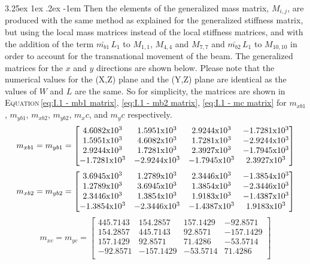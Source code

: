 \documentclass[11pt,a4paper,titlepage]{report}
\makeatletter
\renewcommand\paragraph{\@startsection{paragraph}{5}{\z@}%
  {3.25ex \@plus1ex \@minus.2ex}%
  {-1em}%
  {\normalfont\normalsize\bfseries}}
\makeatother
\begin{document}
\paragraph{}Then the elements of the generalized mass matrix, $M_{i,j}$, are produced with the same method as explained for the generalized stiffness matrix, but using the local mass matrices instead of the local stiffness matrices, and with the addition of the term $\bar{m_{b1}}\,L_1$ to $M_{1,1}$, $M_{4,4}$ and $M_{7,7}$ and $\bar{m_{b2}}\,L_1$ to $M_{10,10}$ in order to account for the transnational movement of the beam. The generalized matrices for the $x$ and $y$ directions are shown below. Please note that the numerical values for the (X,Z) plane and the (Y,Z) plane are identical as the values of $W$ and $L$ are the same. So for simplicity, the matrices are shown in \textsc{Equation}\,\eqref{eq:I.1 - mb1 matrix}, \eqref{eq:I.1 - mb2 matrix}, \eqref{eq:I.1 - mc matrix} for $m_{xb1}$, $m_{yb1}$, $m_{xb2}$, $m_{yb2}$, $m_xc$, and $m_yc$ respectively. 
\begin{equation}
m_{xb1}=m_{yb1}=
\left[
    \begin{matrix}
    4.6082$x$10^3 & 1.5951$x$10^3 & 2.9244$x$10^3 & -1.7281$x$10^3\\
    1.5951$x$10^3 & 4.6082$x$10^3 & 1.7281$x$10^3 & -2.9244$x$10^3\\
    2.9244$x$10^3 & 1.7281$x$10^3 & 2.3927$x$10^3 & -1.7945$x$10^3\\
    -1.7281$x$10^3 & -2.9244$x$10^3 & -1.7945$x$10^3 & 2.3927$x$10^3\\
    \end{matrix}
\right]
\label{eq:I.1 - mb1 matrix}
\end{equation}
\begin{equation}
m_{xb2}=m_{yb2}=
\left[
    \begin{matrix}
    3.6945$x$10^3 & 1.2789$x$10^3 & 2.3446$x$10^3 & -1.3854$x$10^3\\
    1.2789$x$10^3 & 3.6945$x$10^3 & 1.3854$x$10^3 & -2.3446$x$10^3\\
    2.3446$x$10^3 & 1.3854$x$10^3 & 1.9183$x$10^3 & -1.4387$x$10^3\\
   -1.3854$x$10^3 & -2.3446$x$10^3 & -1.4387$x$10^3 & 1.9183$x$10^3\\
    \end{matrix}
\right]
\label{eq:I.1 - mb2 matrix}
\end{equation}
\begin{equation}
m_{xc}=m_{yc}=
\left[
    \begin{matrix}
     445.7143 & 154.2857 & 157.1429 & -92.8571\\
    154.2857 & 445.7143 & 92.8571 & -157.1429\\
    157.1429 & 92.8571 & 71.4286 & -53.5714\\
    -92.8571 & -157.1429 & -53.5714 & 71.4286\\
    \end{matrix}
\right]
\label{eq:I.1 - mc matrix}
\end{equation}
\end{document}

